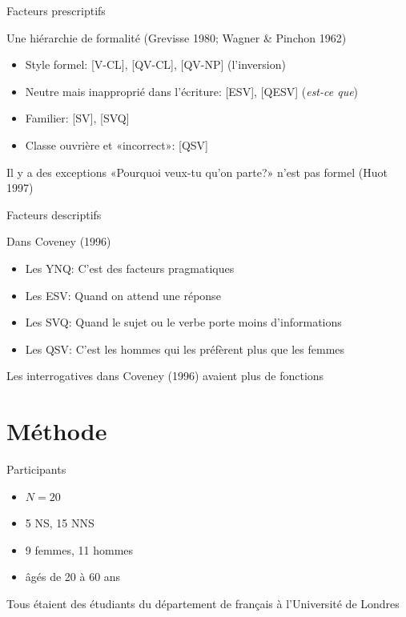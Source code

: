 \documentclass{beamer}
\begin{document}
    \begin{frame}{Facteurs prescriptifs}
      \begin{block}{Une hiérarchie de formalité (Grevisse 1980; Wagner \& Pinchon 1962)}
        \begin{itemize}
          \item Style formel: [V-CL], [QV-CL], [QV-NP] (l'inversion)
          \item Neutre mais inapproprié dans l'écriture: [ESV], [QESV] (\emph{est-ce que})
          \item Familier: [SV], [SVQ]
          \item Classe ouvrière et «incorrect»: [QSV]
        \end{itemize}
      \end{block}
      \begin{block}{Il y a des exceptions}
        «Pourquoi veux-tu qu'on parte?» n'est pas formel (Huot 1997)
      \end{block}
    \end{frame}

    \begin{frame}{Facteurs descriptifs}
      \begin{block}{Dans Coveney (1996)}
        \begin{itemize}
          \item Les YNQ: C'est des facteurs pragmatiques
          \item Les ESV: Quand on attend une réponse
          \item Les SVQ: Quand le sujet ou le verbe porte moins d'informations
          \item Les QSV: C'est les hommes qui les préfèrent plus que les femmes
        \end{itemize}
      \end{block}
      \begin{alertblock}{}
        Les interrogatives dans Coveney (1996) avaient plus de fonctions
      \end{alertblock}
    \end{frame}

  \section{Méthode}
    \begin{frame}{Participants}
      \begin{block}{}
        \begin{itemize}
          \item $N = 20$
          \item 5 NS, 15 NNS
          \item 9 femmes, 11 hommes
          \item âgés de 20 à 60 ans
        \end{itemize}
      \end{block}
      \begin{block}{}
        Tous étaient des étudiants du département de français à l'Université de Londres
      \end{block}
    \end{frame}
\end{document}

